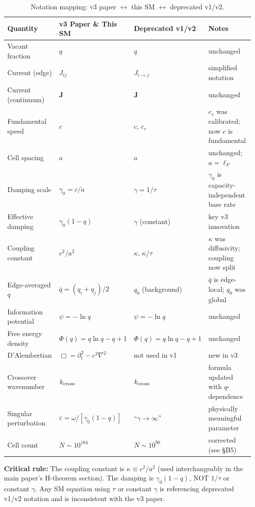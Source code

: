 \documentclass[reprint]{revtex4-2}
\begin{document}
\begin{table}[h]
\caption{Notation mapping: v3 paper $\leftrightarrow$ this SM $\leftrightarrow$ deprecated v1/v2.}
\label{tab:notation}
\begin{tabular}{llll}
\toprule
Quantity & v3 Paper \& This SM & Deprecated v1/v2 & Notes \\
\midrule
Vacant fraction & $q$ & $q$ & unchanged \\
Current (edge) & $J_{ij}$ & $J_{i\to j}$ & simplified notation \\
Current (continuum) & $\mathbf{J}$ & $\mathbf{J}$ & unchanged \\
Fundamental speed & $c$ & $c$, $c_s$ & $c_s$ was calibrated; now $c$ is fundamental \\
Cell spacing & $a$ & $a$ & unchanged; $a=\ell_P$ \\
Damping scale & $\gamma_0 = c/a$ & $\gamma = 1/\tau$ & $\gamma_0$ is capacity-independent base rate \\
Effective damping & $\gamma_0(1-q)$ & $\gamma$ (constant) & key v3 innovation \\
Coupling constant & $c^2/a^2$ & $\kappa$, $\kappa/\tau$ & $\kappa$ was diffusivity; coupling now split \\
Edge-averaged $q$ & $\bar{q} = (q_i+q_j)/2$ & $q_0$ (background) & $\bar{q}$ is edge-local; $q_0$ was global \\
Information potential & $\psi = -\ln q$ & $\psi = -\ln q$ & unchanged \\
Free energy density & $\Phi(q)=q\ln q - q + 1$ & $\Phi(q)=q\ln q - q + 1$ & unchanged \\
D'Alembertian & $\Box = \partial_t^2 - c^2\nabla^2$ & not used in v1 & new in v3 \\
Crossover wavenumber & $k_{\rm cross}$ & $k_{\rm cross}$ & formula updated with $q$-dependence \\
Singular perturbation & $\varepsilon = \omega/[\gamma_0(1-q)]$ & ``$\gamma\to\infty$'' & physically meaningful parameter \\
Cell count & $N \sim 10^{184}$ & $N \sim 10^{90}$ & corrected (see \S B5) \\
\bottomrule
\end{tabular}
\end{table}

\textbf{Critical rule:} The coupling constant is $\kappa\equiv c^2/a^2$ (used interchangeably in the main paper's H-theorem section). The damping is $\gamma_0(1-q)$, NOT $1/\tau$ or constant $\gamma$. Any SM equation using $\tau$ or constant $\gamma$ is referencing deprecated v1/v2 notation and is inconsistent with the v3 paper.
\end{document}
